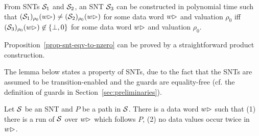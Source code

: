 \begin{proposition}\label{prop-snt-eqv-to-nzero}
From SNTs ${\mathcal{S} }_1$ and ${\mathcal{S} }_2$, an SNT ${\mathcal{S} }_3$ can be constructed in polynomial time such that  $({\mathcal{S} }_1)_{\rho_0}(w\rhd) \neq ({\mathcal{S} }_2)_{\rho_0}(w\rhd)$ for some  data word $w\rhd$ and valuation $\rho_0$  iff $({\mathcal{S} }_3)_{\rho_0}(w\rhd) \not\in \{\bot,0\}$ for some data word $w\rhd$ and valuation $\rho_0$. 
\end{proposition}
Proposition~\ref{prop-snt-eqv-to-nzero} can be proved by a straightforward product construction.

The lemma below states a property of SNTs, due to the fact that the SNTs are assumed to be transition-enabled and the guards are equality-free (cf. the definition of guards in Section~\ref{sec:preliminaries}).

\begin{proposition}\label{prop-snt-distinct-value}
Let ${\mathcal{S} }$ be an SNT and $P$ be a path in ${\mathcal{S} }$. There is a data word $w\rhd$ such that (1) there is a run of ${\mathcal{S} }$ over $w\rhd$ which follows $P$, (2) no data values occur twice in~$w\rhd$.
\end{proposition}



